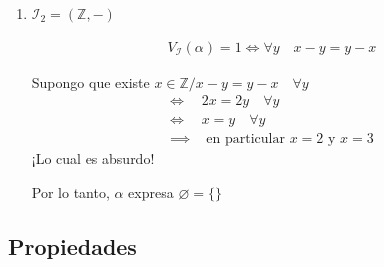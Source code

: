 \begin{itemize}
\begin{enumerate}[label=\alph*)]
\begin{itemize}
                \item $\impliedby$) Sea $X = x_{11} \, Id$. ¿Conmuta con todo
                    $Y$?

                    \begin{align*}
                        X Y &= x_{11} \, \underbrace{Id \, Y}_{Y} 
                        = x_{11} Y \\
                        &= Y x_{11} = \underbrace{Y \, Id}_{Y} \, x_{11} 
                        \notamath{Por conmutatividad con un escalar} \\
                        &= Y \underbrace{(Id \, x_{11})}_{X} = YX 
                        \notamath{Por asociatividad} \\
                    \end{align*}
                \end{itemize}

                Por lo tanto $\alpha$ expresa 
                $A = \{ M \in \mathbb{R}^{2\times 2} / 
                M = m \, Id, m \in \mathbb{R} \}$


            \item $\mathcal{I}_2 = (\mathbb{Z}, -)$

                \begin{gather*}
                    V_{\mathcal{I}}(\alpha) = 1 \iff \forall y \quad x-y=y-x
                \end{gather*}

                Supongo que existe $x \in \mathbb{Z} / 
                x - y = y - x \quad \forall y$
                \begin{align*}
                    \iff & 2x = 2y \quad \forall y \\
                    \iff & x = y \quad \forall y \\
                    \implies & \text{ en particular } x = 2 \text{ y } x = 3
                \end{align*}
                ¡Lo cual es absurdo!

                \begin{center}
                    Por lo tanto, $\alpha$ expresa $\varnothing = \{\}$
                \end{center}
        \end{enumerate}
\end{itemize}

\subsection{Propiedades}


